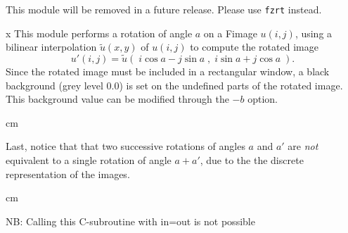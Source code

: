 This module will be removed in a future release. Please use 
\verb+fzrt+ instead.

\vskip 2cm
x
This module performs a rotation of angle $a$ on a Fimage $u(i,j)$, using
a bilinear interpolation $\tilde{u}(x,y)$ of $u(i,j)$ to compute the rotated 
image
$$u'(i,j) = \tilde{u}(\;i \cos a - j \sin a\;,\;i \sin a + j \cos a\;).$$
Since the rotated image must be included in a rectangular window, a 
black background (grey level $0.0$) is set on the undefined parts of
the rotated image. This background value can be modified through the 
$-b$ option.

 cm

Last, notice that that two successive rotations of angles $a$ and $a'$ 
are {\em not} equivalent to a single rotation of angle $a+a'$, due to
the the discrete representation of the images.

 cm

NB: Calling this C-subroutine with in=out is not possible
